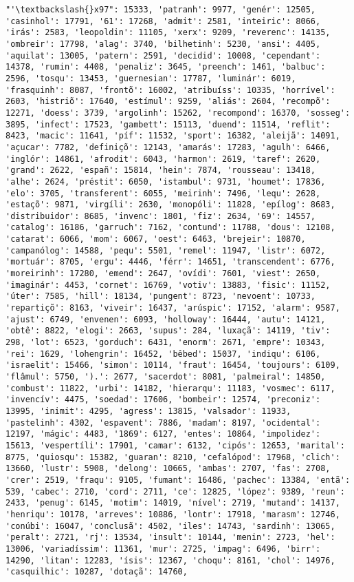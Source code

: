 \documentclass[11pt]{article}
\begin{document}
\begin{Verbatim}[commandchars=\\\{\}]
"'\textbackslash{}x97": 15333, 'patranh': 9977, 'genér': 12505, 'casinhol': 17791, '61': 17268, 'admit': 2581, 'inteiric': 8066, 'irás': 2583, 'leopoldin': 11105, 'xerx': 9209, 'reverenc': 14135, 'ombreir': 17798, 'alag': 3740, 'bilhetinh': 5230, 'ansi': 4405, 'aquilat': 13005, 'patern': 2591, 'decidid': 10008, 'cependant': 14378, 'rumin': 4408, 'penaliz': 3645, 'preench': 1461, 'balbuc': 2596, 'tosqu': 13453, 'guernesian': 17787, 'luminár': 6019, 'frasquinh': 8087, 'frontõ': 16002, 'atribuíss': 10335, 'horrível': 2603, 'histriõ': 17640, 'estímul': 9259, 'aliás': 2604, 'recompõ': 12271, 'doess': 3739, 'argolinh': 15262, 'recompond': 16370, 'sosseg': 3895, 'infect': 17523, 'gambett': 15113, 'duend': 11514, 'reflit': 8423, 'macic': 11641, 'píf': 11532, 'sport': 16382, 'aleijã': 14091, 'açucar': 7782, 'definiçõ': 12143, 'amarás': 17283, 'agulh': 6466, 'inglór': 14861, 'afrodit': 6043, 'harmon': 2619, 'taref': 2620, 'grand': 2622, 'españ': 15814, 'hein': 7874, 'rousseau': 13418, 'alhe': 2624, 'préstit': 6050, 'istambul': 9731, 'houmet': 17836, 'elo': 3705, 'transferent': 6055, 'meirinh': 7496, 'lequ': 2628, 'estaçõ': 9871, 'virgíli': 2630, 'monopóli': 11828, 'epílog': 8683, 'distribuidor': 8685, 'invenc': 1801, 'fiz': 2634, '69': 14557, 'catalog': 16186, 'garruch': 7162, 'contund': 11788, 'dous': 12108, 'catarat': 6066, 'mom': 6067, 'oest': 6463, 'brejeir': 10870, 'campanólog': 14588, 'pequ': 5501, 'remel': 11947, 'listr': 6072, 'mortuár': 8705, 'ergu': 4446, 'férr': 14651, 'transcendent': 6776, 'moreirinh': 17280, 'emend': 2647, 'ovídi': 7601, 'viest': 2650, 'imaginár': 4453, 'cornet': 16769, 'votiv': 13883, 'fisic': 11152, 'úter': 7585, 'hill': 18134, 'pungent': 8723, 'nevoent': 10733, 'repartiçõ': 8163, 'viveir': 16437, 'arúspic': 17152, 'alarm': 9587, 'ajust': 6749, 'envenen': 6093, 'holloway': 16444, 'autu': 14121, 'obtê': 8822, 'elogi': 2663, 'supus': 284, 'luxaçã': 14119, 'tiv': 298, 'lot': 6523, 'gorduch': 6431, 'enorm': 2671, 'empre': 10343, 'rei': 1629, 'lohengrin': 16452, 'bêbed': 15037, 'indiqu': 6106, 'israelit': 15466, 'simon': 10114, 'fraut': 16454, 'toujours': 6109, 'flâmul': 5750, ').': 2677, 'sacerdot': 8081, 'palmeiral': 14850, 'combust': 11822, 'urbi': 14182, 'hierarqu': 11183, 'vosmec': 6117, 'invencív': 4475, 'soedad': 17606, 'bombeir': 12574, 'preconiz': 13995, 'inimit': 4295, 'agress': 13815, 'valsador': 11933, 'pastelinh': 4302, 'espavent': 7886, 'madam': 8197, 'ocidental': 12197, 'mágic': 4483, '1869': 6127, 'entes': 10864, 'impolidez': 15613, 'vespertíli': 17901, 'camar': 6132, 'cipós': 12653, 'marital': 8775, 'quiosqu': 15382, 'guaran': 8210, 'cefalópod': 17968, 'clich': 13660, 'lustr': 5908, 'delong': 10665, 'ambas': 2707, 'fas': 2708, 'crer': 2519, 'fraqu': 9105, 'fumant': 16486, 'pachec': 13384, 'entã': 539, 'cabec': 2710, 'cord': 2711, 'ce': 12825, 'lópez': 9389, 'reun': 2433, 'penug': 6145, 'motim': 14019, 'nível': 2719, 'mutand': 14137, 'henriqu': 10178, 'arreves': 10886, 'lontr': 17918, 'marasm': 12746, 'conúbi': 16047, 'conclusã': 4502, 'iles': 14743, 'sardinh': 13065, 'peralt': 2721, 'rj': 13534, 'insult': 10144, 'menin': 2723, 'hel': 13006, 'variadíssim': 11361, 'mur': 2725, 'impag': 6496, 'birr': 14290, 'litan': 12283, 'ísis': 12367, 'choqu': 8161, 'chol': 14976, 'casquilhic': 10287, 'dotaçã': 14760, 
\end{Verbatim}
\end{document}
